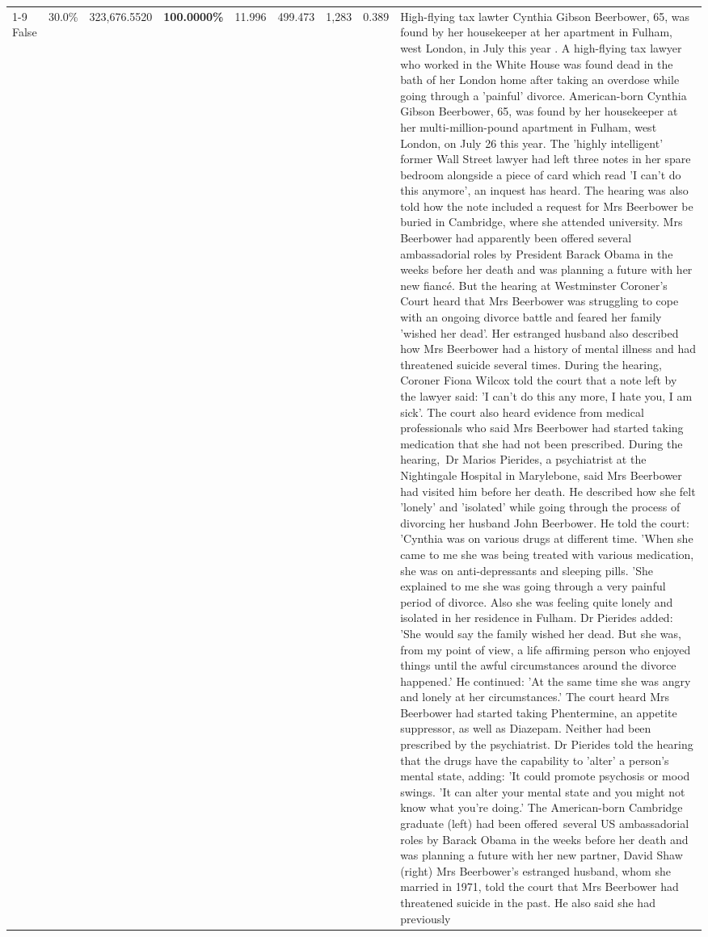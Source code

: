 \begin{table}[H]
\begin{tabular}{lllrlllll}
\cline{1-9}
False & 30.0\% & 323,676.5520 & \bfseries \color{red} 100.0000\% & 11.996 & 499.473 & 1,283 & 0.389 & High-flying tax lawter Cynthia Gibson Beerbower, 65, was found by her housekeeper at her apartment in Fulham, west London, in July this year . A high-flying tax lawyer who worked in the White House was found dead in the bath of her London home after taking an overdose while going through a 'painful' divorce. American-born Cynthia Gibson Beerbower, 65, was found by her housekeeper at her multi-million-pound apartment in Fulham, west London, on July 26 this year. The 'highly intelligent' former Wall Street lawyer had left three notes in her spare bedroom alongside a piece of card which read 'I can't do this anymore', an inquest has heard. The hearing was also told how the note included a request for Mrs Beerbower be buried in Cambridge, where she attended university. Mrs Beerbower had apparently been offered several ambassadorial roles by President Barack Obama in the weeks before her death and was planning a future with her new fiancé. But the hearing at Westminster Coroner's Court heard that Mrs Beerbower was struggling to cope with an ongoing divorce battle and feared her family 'wished her dead'. Her estranged husband also described how Mrs Beerbower had a history of mental illness and had threatened suicide several times. During the hearing, Coroner Fiona Wilcox told the court that a note left by the lawyer said: 'I can't do this any more, I hate you, I am sick'. The court also heard evidence from medical professionals who said Mrs Beerbower had started taking medication that she had not been prescribed. During the hearing, Dr Marios Pierides, a psychiatrist at the Nightingale Hospital in Marylebone, said Mrs Beerbower had visited him before her death. He described how she felt 'lonely' and 'isolated' while going through the process of divorcing her husband John Beerbower. He told the court: 'Cynthia was on various drugs at different time. 'When she came to me she was being treated with various medication, she was on anti-depressants and sleeping pills. 'She explained to me she was going through a very painful period of divorce. Also she was feeling quite lonely and isolated in her residence in Fulham. Dr Pierides added: 'She would say the family wished her dead. But she was, from my point of view, a life affirming person who enjoyed things until the awful circumstances around the divorce happened.' He continued: 'At the same time she was angry and lonely at her circumstances.' The court heard Mrs Beerbower had started taking Phentermine, an appetite suppressor, as well as Diazepam. Neither had been prescribed by the psychiatrist. Dr Pierides told the hearing that the drugs have the capability to 'alter' a person's mental state, adding: 'It could promote psychosis or mood swings. 'It can alter your mental state and you might not know what you're doing.' The American-born Cambridge graduate (left) had been offered several US ambassadorial roles by Barack Obama in the weeks before her death and was planning a future with her new partner, David Shaw (right) Mrs Beerbower's estranged husband, whom she married in 1971, told the court that Mrs Beerbower had threatened suicide in the past. He also said she had previously 
\end{tabular}
\end{table}
